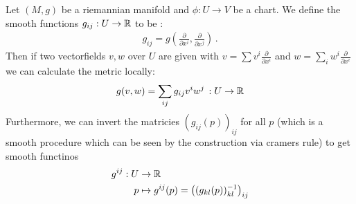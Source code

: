 \begin{definition}
	Let $(M,g)$ be a riemannian manifold and $\phi:U\to V$ be a chart. We define the smooth functions $g_{ij}:U\to \mathbb{R}$ to be :
	\begin{align*}
		g_{ij}=g(\frac{\partial}{\partial x^i},\frac{\partial}{\partial x^j}) \, .
	\end{align*}
	Then if two vectorfields $v,w$ over $U$ are given with $v=\sum v^i \frac{\partial}{\partial x^i}$ and $w=\sum _i w^i \frac{\partial}{\partial x^i}$ we can calculate the metric locally:
	\begin{align*}
		g(v,w)=\sum_{ij}g_{ij} v^iw^j\, :U\to \mathbb{R}
	\end{align*} Furthermore, we can invert the matricies $(g_{ij}(p))_{ij}$ for all $p$ (which is a smooth procedure which can be seen by the construction via cramers rule) to get smooth functinos 
\begin{align*}
	g^{ij}: U&\to \mathbb{R}\\
p&\mapsto g^{ij}(p)= \left( (g_{kl}(p))_{kl}^{-1} \right)_{ij}
\end{align*}
\end{definition}



